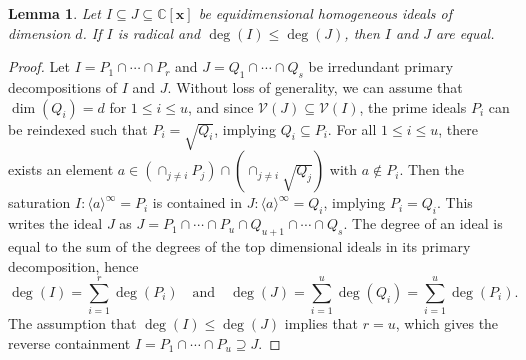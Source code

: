 \documentclass[10pt]{amsart}
\newtheorem{lemm}[theo]{Lemma}
\theoremstyle{definition}
\newcommand{\Cbb}{\mathbb{C}}
\newcommand{\V}{\mathcal{V}}
\newcommand{\x}{\mathbf{x}}
\begin{document}
\begin{lemm} \label{lem:EquidimEquality}
Let $I\subseteq J\subseteq\Cbb[\x]$ be equidimensional homogeneous ideals of dimension $d$. If $I$ is radical and $\deg(I)\leq \deg(J)$, then $I$ and $J$ are equal. 
\end{lemm}
\begin{proof}
Let $I = P_1 \cap \cdots \cap P_r$ and $J = Q_1 \cap \cdots \cap Q_s$ be irredundant primary decompositions of $I$ and $J$.
Without loss of generality, we can assume that $\dim(Q_i) = d$ for $1 \leq i \leq u$, and since $\V(J) \subseteq \V(I)$, the prime ideals $P_i$ can be reindexed such that $P_i=\sqrt{Q_i}$, 
implying $Q_i \subseteq P_i$. 
For all $1 \leq i \leq u$, there exists an element $a\in (\cap_{j\neq i}P_j) \cap (\cap_{j\neq i}\sqrt{Q_j})$ with $a\not\in P_i$. 
Then the saturation $I:\langle a\rangle^{\infty} = P_i $ is contained in $ J:\langle a\rangle^{\infty} = Q_i$, implying $P_i = Q_i$. 
This writes the ideal $J$ as $J=P_1\cap \cdots \cap P_{u}\cap Q_{u+1} \cap \cdots \cap Q_s$. 
The degree of an ideal is equal to the sum of the degrees of the top dimensional ideals in its primary decomposition, hence
\[
\deg(I) = \sum_{i=1}^r \deg(P_i)  \quad \text{and} \quad 
\deg(J) = \sum_{i=1}^u \deg(Q_i)=\sum_{i=1}^u \deg(P_i).
\]
The assumption that $\deg(I)\leq \deg(J)$ implies that $r=u$, which gives the reverse containment
$I = P_1 \cap \cdots \cap P_u \supseteq J$.
\end{proof}
\end{document}
